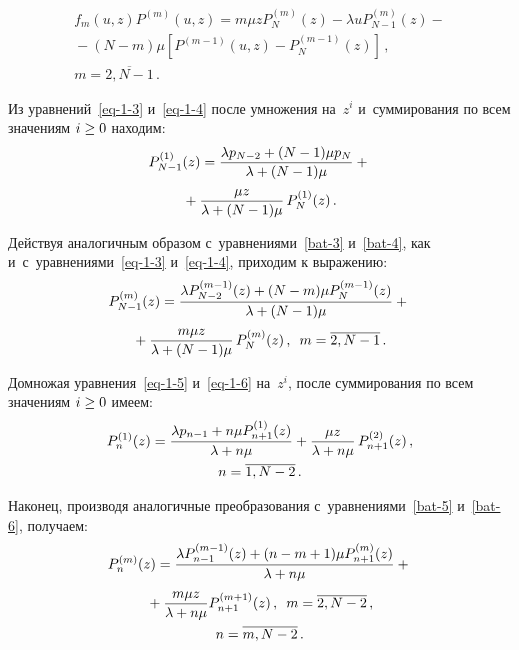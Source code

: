 \begin{multicols}{2}
\pagebreak

\noindent
\begin{multline}
\label{bat-2*}
f_m(u,z) P^{(m)}(u,z) = m \mu z P^{(m)}_{N}(z)
- \lambda u P^{(m)}_{N-1}(z) -{}\\
{}-
(N-m) \mu [P^{(m-1)}(u,z) - P^{(m-1)}_{N}(z)]\,,\\ m=\overline{2,N-1}\,.
\end{multline}

Из уравнений~\eqref{eq-1-3} и~\eqref{eq-1-4}
после умножения на~$z^i$ и~суммирования по
всем значениям $i \hm\ge 0$ находим:
\begin{multline}
\label{eq-z-3}
P^{(1)}_{N-1}(z)=\displaystyle\frac{\displaystyle \lambda p_{N-2} + (N-1)\mu p_{N}\mathstrut}{\displaystyle \lambda+(N-1)\mu \mathstrut}+{}\\
{}+ \displaystyle\frac{\displaystyle \mu z\mathstrut}{\displaystyle \lambda+(N-1)\mu\mathstrut} \,P^{(1)}_N(z)\,.
\end{multline}

Действуя аналогичным образом
с~уравнениями~\eqref{bat-3} и~\eqref{bat-4}, как и~с~уравнениями~\eqref{eq-1-3}
и~\eqref{eq-1-4}, приходим к выражению:
\begin{multline}
\label{bat-4*}
P^{(m)}_{N-1}(z) = \displaystyle\frac{\displaystyle  \lambda P^{(m-1)}_{N-2}(z) + (N-m) \mu P^{(m-1)}_{N}(z)
\mathstrut}{\displaystyle \lambda+(N-1)\mu \mathstrut}+{}\\
{}+\displaystyle\frac{\displaystyle m \mu z\mathstrut}{\displaystyle \lambda+(N-1)\mu\mathstrut}\,P^{(m)}_{N}(z) \,,\enskip m=\overline{2,N-1}\,.
\end{multline}


Домножая уравнения~\eqref{eq-1-5} и~\eqref{eq-1-6}
на~$z^i$, после суммирования по всем
значениям $i \hm\ge 0$ имеем:
\begin{multline}
\label{eq-z-4}
P^{(1)}_{n}(z)= \displaystyle\frac{\displaystyle  \lambda p_{n-1} + n \mu P^{(1)}_{n+1}(z) \mathstrut}{\displaystyle 
\lambda+n\mu \mathstrut}+ \displaystyle\frac{\displaystyle \mu z\mathstrut}{\displaystyle \lambda+n\mu\mathstrut}\,P^{(2)}_{n+1}(z) \,,\\
n=\overline{1,N-2}\,.
\end{multline}

Наконец, производя аналогичные преобразования
с~уравнениями~\eqref{bat-5} и~\eqref{bat-6}, получаем:
\begin{multline}
\label{bat-6*}
P^{(m)}_n(z)= \displaystyle\frac{\displaystyle \lambda P^{(m-1)}_{n-1}(z) +
(n-m+1) \mu P^{(m)}_{n+1}(z)\mathstrut}{\displaystyle \lambda+n\mu\mathstrut}
+{}
\\
{}+
\displaystyle\frac{\displaystyle m \mu z\mathstrut}{\displaystyle \lambda+n\mu\mathstrut} P^{(m+1)}_{n+1}(z)\,,\enskip
m=\overline{2,N-2}\,,\\
n=\overline{m,N-2}\,.
\end{multline}


\end{multicols}
